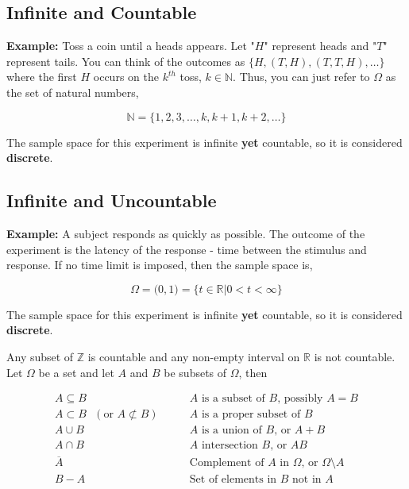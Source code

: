 \documentclass[12pt]{article}
\newcommand{\N}{\mathbb{N}}
\newcommand{\Z}{\mathbb{Z}}
\newcommand{\R}{\mathbb{R}}
\begin{document}
\vspace{.3cm}
\subsection*{Infinite and Countable}
\begin{tcolorbox}
\textbf{Example:} Toss a coin until a heads appears. Let "$H$" represent heads and "$T$" represent tails. You can think of the outcomes as $\big \{ H, (T,H), (T,T,H), \ldots \big \}$ where the first $H$ occurs on the $k^{th}$ toss, $k \in \N$. Thus, you can just refer to $\Omega$ as the set of natural numbers,

\begin{equation*}
\N = \big \{ 1, 2, 3, \ldots, k, k+1, k+2, \ldots \big \}
\end{equation*}

\noindent
The sample space for this experiment is infinite \textbf{yet} countable, so it is considered \textbf{discrete}.
\end{tcolorbox}

\subsection*{Infinite and Uncountable}
\begin{tcolorbox}
\textbf{Example:} A subject responds as quickly as possible. The outcome of the experiment is the latency of the response - time between the stimulus and response. If no time limit is imposed, then the sample space is,

\begin{equation*}
\Omega = \big ( 0, 1 \big ) = \big \{ t \in \R | 0 < t < \infty \big \}
\end{equation*}

\noindent
The sample space for this experiment is infinite \textbf{yet} countable, so it is considered \textbf{discrete}.
\end{tcolorbox}

\vspace{.3cm}
\noindent
Any subset of $\Z$ is countable and any non-empty interval on $\R$ is not countable. Let $\Omega$ be a set and let $A$ and $B$ be subsets of $\Omega$, then

\begin{align*}
A \subseteq B & \qquad A \text{ is a subset of } B \text{, possibly } A=B \\
A \subset B \text{ }(\text{or } A \not \subset B) & \qquad A \text{ is a proper subset of } B \\
A \cup B & \qquad A \text{ is a union of } B \text{, or } A+B \\
A \cap B & \qquad A \text{ intersection } B \text{, or } AB \\
\overline{A} & \qquad \text{Complement of }  A \text{ in } \Omega \text{, or } \Omega \setminus A \\
B-A & \qquad \text{Set of elements in } B \text{ not in } A \\
\end{align*}
\end{document}
